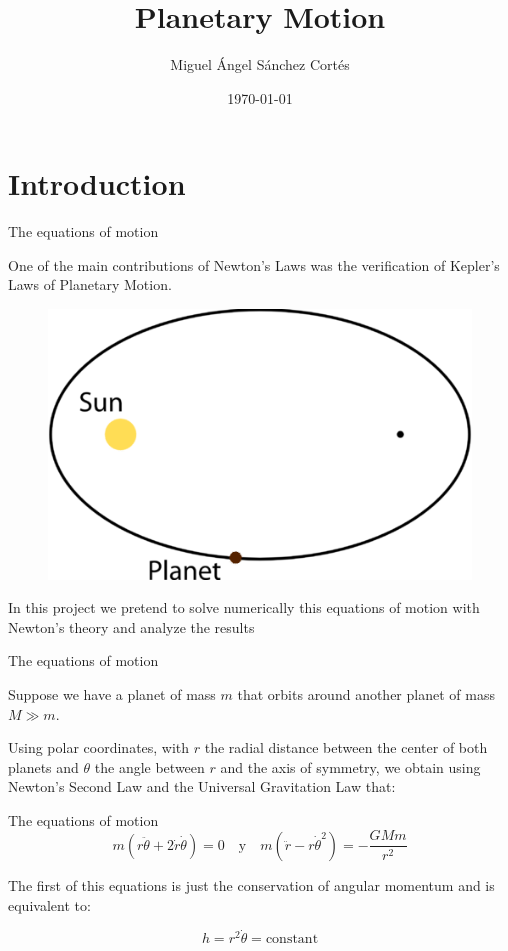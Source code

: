 \documentclass[hyperref={pdfpagelabels=false}]{beamer}
\title{Planetary Motion}
\author[Facultad de Ciencias]{Miguel Ángel Sánchez Cortés}
\institute{Facultad de Ciencias, UNAM}
\date{\today}
\begin{document}
\maketitleandtoc

\section{Introduction}
\begin{frame}{The equations of motion}\justifying

One of the main contributions of Newton's Laws was the verification of Kepler's Laws of Planetary Motion.

\vspace{10pt}

\begin{figure}
        \includegraphics[width=0.4\linewidth]{Figures/kepler2.png}\\ \vspace{1cm}
    \end{figure}

\vspace{-15pt}

In this project we pretend to solve numerically this equations of motion with Newton's theory and analyze the results

\end{frame}
\begin{frame}{The equations of motion}

Suppose we have a planet of mass $m$ that orbits around another planet of mass $M \gg m$. 

\vspace{10pt}

Using polar coordinates, with $r$ the radial distance between the center of both planets and $\theta$ the angle between $r$ and the axis of symmetry, we obtain using Newton's Second Law and the Universal Gravitation Law that:


\begin{block}{The equations of motion}
\begin{equation}
m(r\ddot{\theta}+2\dot{r}\dot{\theta})=0 \quad \text{y} \quad m(\ddot{r}-r\dot{\theta}^{2})=-\frac{GMm}{r^{2}}
\end{equation}
\end{block}

The first of this equations is just the conservation of angular momentum and is equivalent to:

\begin{equation}
h=r^{2} \dot{\theta} = \text{constant}
\end{equation}

\end{frame}
\end{document}
